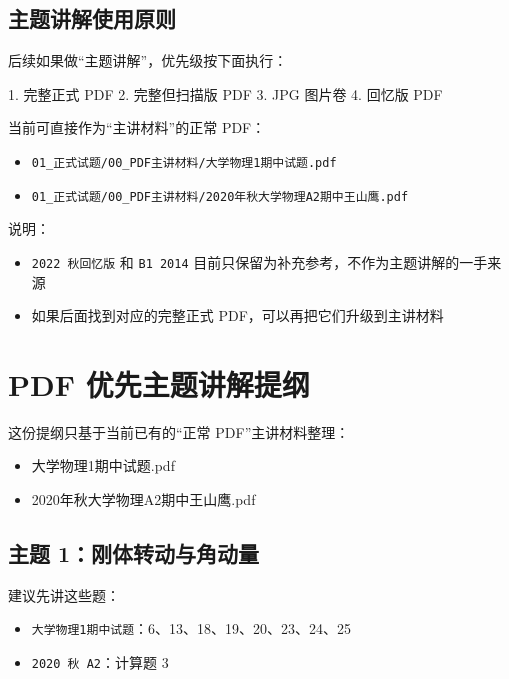 \documentclass[12pt,a4paper]{ctexart}
\begin{document}
\subsection{主题讲解使用原则}

后续如果做“主题讲解”，优先级按下面执行：

1. 完整正式 PDF 2. 完整但扫描版 PDF 3. JPG 图片卷 4. 回忆版 PDF

当前可直接作为“主讲材料”的正常 PDF：

\begin{itemize}

\item \texttt{01\_正式试题/00\_PDF主讲材料/大学物理1期中试题.pdf}

\item \texttt{01\_正式试题/00\_PDF主讲材料/2020年秋大学物理A2期中王山鹰.pdf}

\end{itemize}

说明：

\begin{itemize}

\item \texttt{2022 秋回忆版} 和 \texttt{B1 2014} 目前只保留为补充参考，不作为主题讲解的一手来源

\item 如果后面找到对应的完整正式 PDF，可以再把它们升级到主讲材料

\end{itemize}


\section{PDF 优先主题讲解提纲}

这份提纲只基于当前已有的“正常 PDF”主讲材料整理：

\begin{itemize}

\item 大学物理1期中试题.pdf

\item 2020年秋大学物理A2期中王山鹰.pdf

\end{itemize}

\subsection{主题 1：刚体转动与角动量}

建议先讲这些题：

\begin{itemize}

\item \texttt{大学物理1期中试题}：6、13、18、19、20、23、24、25

\item \texttt{2020 秋 A2}：计算题 3

\end{itemize}
\end{document}
